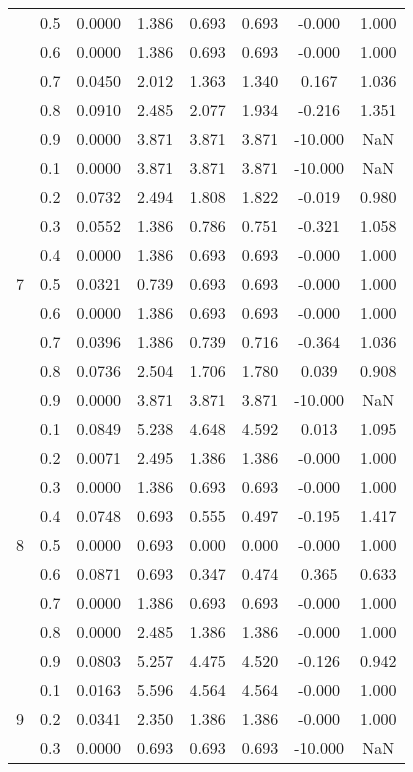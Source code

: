 \documentclass[11pt,a4paper]{report}
\begin{document}
\begin{longtable}{ | c | c || c | c | c | c | c | c | }
 & 0.5 & 0.0000 & 1.386 & 0.693 & 0.693 & -0.000 & 1.000 \\
 & 0.6 & 0.0000 & 1.386 & 0.693 & 0.693 & -0.000 & 1.000 \\
 & 0.7 & 0.0450 & 2.012 & 1.363 & 1.340 & 0.167 & 1.036 \\
 & 0.8 & 0.0910 & 2.485 & 2.077 & 1.934 & -0.216 & 1.351 \\
 & 0.9 & 0.0000 & 3.871 & 3.871 & 3.871 & -10.000 & NaN \\
 \hline
\multirow{9}{*}{7} & 0.1 & 0.0000 & 3.871 & 3.871 & 3.871 & -10.000 & NaN \\
 & 0.2 & 0.0732 & 2.494 & 1.808 & 1.822 & -0.019 & 0.980 \\
 & 0.3 & 0.0552 & 1.386 & 0.786 & 0.751 & -0.321 & 1.058 \\
 & 0.4 & 0.0000 & 1.386 & 0.693 & 0.693 & -0.000 & 1.000 \\
 & 0.5 & 0.0321 & 0.739 & 0.693 & 0.693 & -0.000 & 1.000 \\
 & 0.6 & 0.0000 & 1.386 & 0.693 & 0.693 & -0.000 & 1.000 \\
 & 0.7 & 0.0396 & 1.386 & 0.739 & 0.716 & -0.364 & 1.036 \\
 & 0.8 & 0.0736 & 2.504 & 1.706 & 1.780 & 0.039 & 0.908 \\
 & 0.9 & 0.0000 & 3.871 & 3.871 & 3.871 & -10.000 & NaN \\
 \hline
\multirow{9}{*}{8} & 0.1 & 0.0849 & 5.238 & 4.648 & 4.592 & 0.013 & 1.095 \\
 & 0.2 & 0.0071 & 2.495 & 1.386 & 1.386 & -0.000 & 1.000 \\
 & 0.3 & 0.0000 & 1.386 & 0.693 & 0.693 & -0.000 & 1.000 \\
 & 0.4 & 0.0748 & 0.693 & 0.555 & 0.497 & -0.195 & 1.417 \\
 & 0.5 & 0.0000 & 0.693 & 0.000 & 0.000 & -0.000 & 1.000 \\
 & 0.6 & 0.0871 & 0.693 & 0.347 & 0.474 & 0.365 & 0.633 \\
 & 0.7 & 0.0000 & 1.386 & 0.693 & 0.693 & -0.000 & 1.000 \\
 & 0.8 & 0.0000 & 2.485 & 1.386 & 1.386 & -0.000 & 1.000 \\
 & 0.9 & 0.0803 & 5.257 & 4.475 & 4.520 & -0.126 & 0.942 \\
 \hline
\multirow{9}{*}{9} & 0.1 & 0.0163 & 5.596 & 4.564 & 4.564 & -0.000 & 1.000 \\
 & 0.2 & 0.0341 & 2.350 & 1.386 & 1.386 & -0.000 & 1.000 \\
 & 0.3 & 0.0000 & 0.693 & 0.693 & 0.693 & -10.000 & NaN \\

\end{longtable}
\end{document}
